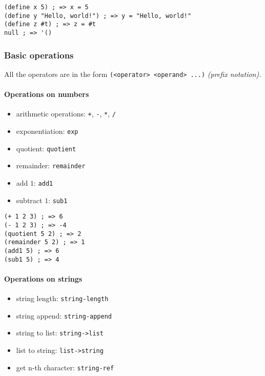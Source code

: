 \documentclass[a4paper,landscape,10pt]{article}
\begin{document}
\begin{multicols*}{2}
  \begin{lstlisting}[language=Racket]
(define x 5) ; => x = 5
(define y "Hello, world!") ; => y = "Hello, world!"
(define z #t) ; => z = #t
null ; => '()
\end{lstlisting}

  \switchcolumn

  \subsubsection{Basic operations}

  All the operators are in the form \lstinline[language=Racket]!(<operator> <operand> ...)! \textit{(prefix notation).}

  \paragraph{Operations on numbers}

  \begin{itemize}
    \item arithmetic operations: \lstinline[language=Racket]!+!, \lstinline[language=Racket]!-!, \lstinline[language=Racket]!*!, \lstinline[language=Racket]!/!
    \item exponentiation: \lstinline[language=Racket]!exp!
    \item quotient: \lstinline[language=Racket]!quotient!
    \item remainder: \lstinline[language=Racket]!remainder!
    \item add \(1\): \lstinline[language=Racket]!add1!
    \item subtract \(1\): \lstinline[language=Racket]!sub1!
  \end{itemize}

  \begin{lstlisting}[language=Racket]
(+ 1 2 3) ; => 6
(- 1 2 3) ; => -4
(quotient 5 2) ; => 2
(remainder 5 2) ; => 1
(add1 5) ; => 6
(sub1 5) ; => 4
\end{lstlisting}

  \paragraph{Operations on strings}

  \begin{itemize}
    \item string length: \lstinline[language=Racket]!string-length!
    \item string append: \lstinline[language=Racket]!string-append!
    \item string to list: \lstinline[language=Racket]!string->list!
    \item list to string: \lstinline[language=Racket]!list->string!
    \item get n-th character: \lstinline[language=Racket]!string-ref!
  \end{itemize}


\end{multicols*}
\end{document}
